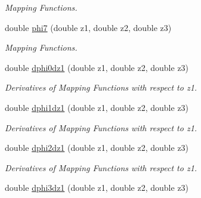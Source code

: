 \begin{DoxyCompactItemize}
\begin{DoxyCompactList}\small\item\em Mapping Functions. \item\end{DoxyCompactList}\item 
\hypertarget{classfemfunctions_a8d8e4a67c3ff415b99ccd83a6518410e}{
double \hyperlink{classfemfunctions_a8d8e4a67c3ff415b99ccd83a6518410e}{phi7} (double z1, double z2, double z3)}
\label{classfemfunctions_a8d8e4a67c3ff415b99ccd83a6518410e}

\begin{DoxyCompactList}\small\item\em Mapping Functions. \item\end{DoxyCompactList}\item 
\hypertarget{classfemfunctions_ac8287af771d18dd66ad3a42b5f19b301}{
double \hyperlink{classfemfunctions_ac8287af771d18dd66ad3a42b5f19b301}{dphi0dz1} (double z1, double z2, double z3)}
\label{classfemfunctions_ac8287af771d18dd66ad3a42b5f19b301}

\begin{DoxyCompactList}\small\item\em Derivatives of Mapping Functions with respect to z1. \item\end{DoxyCompactList}\item 
\hypertarget{classfemfunctions_a181fd15e4b641c163733679b36a587c6}{
double \hyperlink{classfemfunctions_a181fd15e4b641c163733679b36a587c6}{dphi1dz1} (double z1, double z2, double z3)}
\label{classfemfunctions_a181fd15e4b641c163733679b36a587c6}

\begin{DoxyCompactList}\small\item\em Derivatives of Mapping Functions with respect to z1. \item\end{DoxyCompactList}\item 
\hypertarget{classfemfunctions_a1e42531370508dfea87370a9f05d7dec}{
double \hyperlink{classfemfunctions_a1e42531370508dfea87370a9f05d7dec}{dphi2dz1} (double z1, double z2, double z3)}
\label{classfemfunctions_a1e42531370508dfea87370a9f05d7dec}

\begin{DoxyCompactList}\small\item\em Derivatives of Mapping Functions with respect to z1. \item\end{DoxyCompactList}\item 
\hypertarget{classfemfunctions_a25c783cf78af0b72ae2b99cf9bb91de5}{
double \hyperlink{classfemfunctions_a25c783cf78af0b72ae2b99cf9bb91de5}{dphi3dz1} (double z1, double z2, double z3)}
\label{classfemfunctions_a25c783cf78af0b72ae2b99cf9bb91de5}


\end{DoxyCompactItemize}
